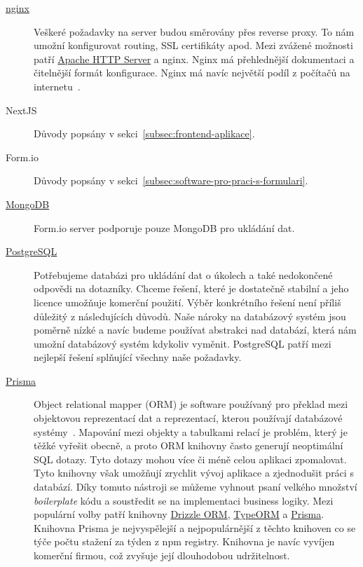 \begin{description}
    \item[\href{https://nginx.org/}{nginx}]
    Veškeré požadavky na server budou směrovány přes reverse proxy.
    To nám umožní konfigurovat routing, SSL certifikáty apod.
    Mezi zvážené možnosti patří \href{https://httpd.apache.org/}{Apache HTTP Server} a nginx.
    Nginx má přehlednější dokumentaci a čitelnější formát konfigurace.
    Nginx má navíc největší podíl z počítačů na internetu~\cite{server-survey}.
    \item[NextJS]
    Důvody popsány v sekci~\ref{subsec:frontend-aplikace}.
    \item[Form.io]
    Důvody popsány v sekci~\ref{subsec:software-pro-praci-s-formulari}.
    \item[\href{https://www.mongodb.com/}{MongoDB}]
    Form.io server podporuje pouze MongoDB pro ukládání dat\@.
    \item[\href{https://www.postgresql.org/}{PostgreSQL}]
    Potřebujeme databázi pro ukládání dat o úkolech a také nedokončené odpovědi na dotazníky.
    Chceme řešení, které je dostatečně stabilní a jeho licence umožňuje komerční použití.
    Výběr konkrétního řešení není příliš důležitý z následujících důvodů.
    Naše nároky na databázový systém jsou poměrně nízké a navíc budeme používat abstrakci nad databází, která nám umožní databázový systém kdykoliv vyměnit.
    PostgreSQL patří mezi nejlepší řešení splňující všechny naše požadavky.
    \item[\href{https://www.prisma.io/}{Prisma}]
    Object relational mapper (ORM) je software používaný pro překlad mezi objektovou reprezentací dat a reprezentací, kterou používají databázové systémy~\cite{orm-definition}.
    Mapování mezi objekty a tabulkami relací je problém, který je těžké vyřešit obecně, a proto ORM knihovny často generují neoptimální SQL dotazy.
    Tyto dotazy mohou více či méně celou aplikaci zpomalovat.
    Tyto knihovny však umožňují zrychlit vývoj aplikace a zjednodušit práci s databází.
    Díky tomuto nástroji se můžeme vyhnout psaní velkého množství \textit{boilerplate} kódu a soustředit se na implementaci business logiky.
    Mezi populární volby patří knihovny \href{https://github.com/drizzle-team/drizzle-orm}{Drizzle ORM}, \href{https://github.com/typeorm/typeorm}{TypeORM} a \href{https://github.com/prisma/prisma}{Prisma}.
    Knihovna Prisma je nejvyspělejší a nejpopulárnější z těchto knihoven co se týče počtu stažení za týden z npm registry.
    Knihovna je navíc vyvíjen komerční firmou, což zvyšuje její dlouhodobou udržitelnost.
\end{description}


